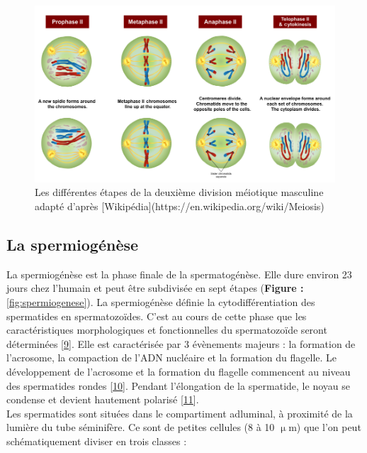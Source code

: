 \documentclass[12pt,twoside]{reedthesis}
\theoremstyle{definition}
\theoremstyle{definition}
\theoremstyle{remark}
\begin{document}
  \begin{figure}
  
  {\centering \includegraphics[scale=0.43]{figure/MeiosisII} 
  
  }
  
  \caption[Les différentes étapes de la deuxième division méiotique masculine adapté]{Les différentes étapes de la deuxième division méiotique masculine adapté d'après [Wikipédia](https://en.wikipedia.org/wiki/Meiosis)}\label{fig:meioseii}
  \end{figure}
  
  \newpage
  
  \hypertarget{spermiogenese}{\subsection{La
  spermiogénèse}\label{spermiogenese}}
  
  La spermiogénèse est la phase finale de la spermatogénèse. Elle dure
  environ 23 jours chez l'humain et peut être subdivisée en sept étapes
  (\textbf{Figure : }\ref{fig:spermiogenese}). La spermiogénèse définie la
  cytodifférentiation des spermatides en spermatozoïdes. C'est au cours de
  cette phase que les caractéristiques morphologiques et fonctionnelles du
  spermatozoïde seront déterminées
  {[}\protect\hyperlink{ref-YvesClermontRichardOko1993}{9}{]}. Elle est
  caractérisée par 3 évènements majeurs : la formation de l'acrosome, la
  compaction de l'ADN nucléaire et la formation du flagelle. Le
  développement de l'acrosome et la formation du flagelle commencent au
  niveau des spermatides rondes
  {[}\protect\hyperlink{ref-Escalier1991}{10}{]}. Pendant l'élongation de
  la spermatide, le noyau se condense et devient hautement polarisé
  {[}\protect\hyperlink{ref-Hamilton1987}{11}{]}.\\
  Les spermatides sont situées dans le compartiment adluminal, à proximité
  de la lumière du tube séminifère. Ce sont de petites cellules (8 à 10
  \(\upmu\)m) que l'on peut schématiquement diviser en trois classes :
  
\end{document}
